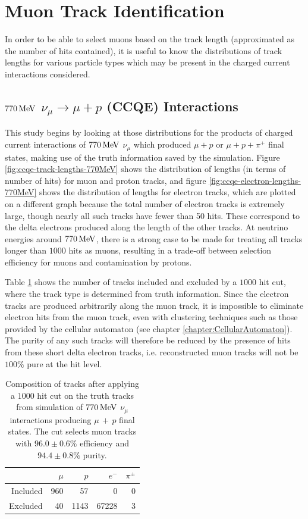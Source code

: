 \section{Muon Track Identification}
In order to be able to select muons based on the track length (approximated as the number of hits contained), it is useful to know the distributions of track lengths for various particle types which may be present in the charged current interactions considered. 

\subsection{$770\MeV$ $\nu_\mu \rightarrow \mu + p$ (CCQE) Interactions}
This study begins by looking at those distributions for the products of charged current interactions of $770\MeV$ $\nu_\mu$ which produced $\mu + p$ or $\mu + p + \pi^+$ final states, making use of the truth information saved by the simulation. Figure \ref{fig:ccqe-track-lengths-770MeV} shows the distribution of lengths (in terms of number of hits) for muon and proton tracks, and figure \ref{fig:ccqe-electron-lengths-770MeV} shows the distribution of lengths for electron tracks, which are plotted on a different graph because the total number of electron tracks is extremely large, though nearly all such tracks have fewer than 50 hits. These correspond to the delta electrons produced along the length of the other tracks. At neutrino energies around $770\MeV$, there is a strong case to be made for treating all tracks longer than $1000$ hits as muons, resulting in a trade-off between selection efficiency for muons and contamination by protons.

Table \ref{table:cut-results-ccqe-0.77} shows the number of tracks included and excluded by a $1000$ hit cut, where the track type is determined from truth information. Since the electron tracks are produced arbitrarily along the muon track, it is impossible to eliminate electron hits from the muon track, even with clustering techniques such as those provided by the cellular automaton (see chapter \ref{chapter:CellularAutomaton}). The purity of any such tracks will therefore be reduced by the presence of hits from these short delta electron tracks, i.e. reconstructed muon tracks will not be $100\%$ pure at the hit level.

\begin{table}
\centering
\begin{tabular}{*{5}{r}}
 & $\mu$ & $p$ & $e^-$ & $\pi^\pm$ \\
\hline
\hline
Included & 960 & 57 & 0 & 0 \\
Excluded & 40 & 1143 & 67228 & 3 \\
\hline
\end{tabular}
\caption[Composition of tracks after $1000$ hit cut on $770\MeV$ CCQE events]{\label{table:cut-results-ccqe-0.77}Composition of tracks after applying a $1000$ hit cut on the truth tracks from simulation of $770\MeV$ $\nu_\mu$ interactions producing $\mu\, +\,p$ final states. The cut selects muon tracks with $96.0\pm0.6\%$ efficiency and $94.4\pm0.8\%$ purity.}
\end{table}

